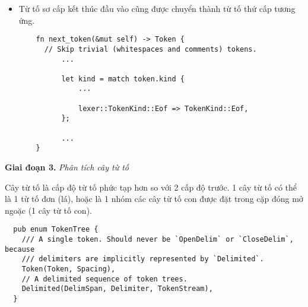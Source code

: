 \begin{itemize}
\begin{lstlisting}
          ...
    }
  \end{lstlisting}
  \item Từ tố sơ cấp kết thúc đầu vào cũng được chuyển thành từ tố thứ cấp tương ứng.
  \begin{lstlisting}
    fn next_token(&mut self) -> Token {
      // Skip trivial (whitespaces and comments) tokens.
          ...
  
          let kind = match token.kind {
              ...    
  
              lexer::TokenKind::Eof => TokenKind::Eof,
          };
  
          ...
    }
  \end{lstlisting}
\end{itemize}

\textbf{Giai đoạn 3.} \textit{Phân tích cây từ tố}

Cây từ tố là cấp độ từ tố phức tạp hơn so với 2 cấp độ trước. 1 cây từ tố có thể là 1 từ tố đơn (lá), hoặc là 1 nhóm các cây từ tố con được đặt trong cặp đóng mở ngoặc (1 cây từ tố con).

\begin{lstlisting}
  pub enum TokenTree {
    /// A single token. Should never be `OpenDelim` or `CloseDelim`, because
    /// delimiters are implicitly represented by `Delimited`.
    Token(Token, Spacing),
    // A delimited sequence of token trees.
    Delimited(DelimSpan, Delimiter, TokenStream),
  }
\end{lstlisting}

